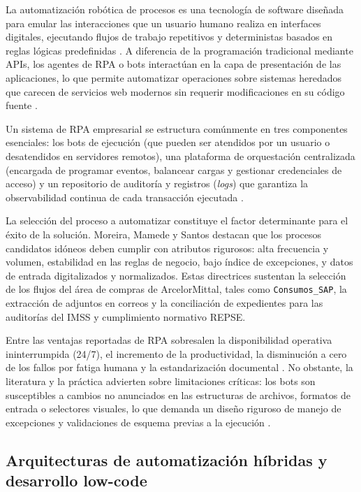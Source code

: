 La automatización robótica de procesos es una tecnología de software diseñada para emular las interacciones que un usuario humano realiza en interfaces digitales, ejecutando flujos de trabajo repetitivos y deterministas basados en reglas lógicas predefinidas \cite{syed2020rpa}. A diferencia de la programación tradicional mediante APIs, los agentes de RPA o bots interactúan en la capa de presentación de las aplicaciones, lo que permite automatizar operaciones sobre sistemas heredados que carecen de servicios web modernos sin requerir modificaciones en su código fuente \cite{hallikainen2018rpa}.

Un sistema de RPA empresarial se estructura comúnmente en tres componentes esenciales: los bots de ejecución (que pueden ser atendidos por un usuario o desatendidos en servidores remotos), una plataforma de orquestación centralizada (encargada de programar eventos, balancear cargas y gestionar credenciales de acceso) y un repositorio de auditoría y registros (\emph{logs}) que garantiza la observabilidad continua de cada transacción ejecutada \cite{syed2020rpa}.

La selección del proceso a automatizar constituye el factor determinante para el éxito de la solución. Moreira, Mamede y Santos \cite{moreira2023rpa} destacan que los procesos candidatos idóneos deben cumplir con atributos rigurosos: alta frecuencia y volumen, estabilidad en las reglas de negocio, bajo índice de excepciones, y datos de entrada digitalizados y normalizados. Estas directrices sustentan la selección de los flujos del área de compras de ArcelorMittal, tales como \texttt{Consumos\_SAP}, la extracción de adjuntos en correos y la conciliación de expedientes para las auditorías del IMSS y cumplimiento normativo REPSE.

Entre las ventajas reportadas de RPA sobresalen la disponibilidad operativa ininterrumpida (24/7), el incremento de la productividad, la disminución a cero de los fallos por fatiga humana y la estandarización documental \cite{moreira2023rpa}. No obstante, la literatura y la práctica advierten sobre limitaciones críticas: los bots son susceptibles a cambios no anunciados en las estructuras de archivos, formatos de entrada o selectores visuales, lo que demanda un diseño riguroso de manejo de excepciones y validaciones de esquema previas a la ejecución \cite{prucha2026rpa}.


\subsection{Arquitecturas de automatización híbridas y desarrollo low-code}

